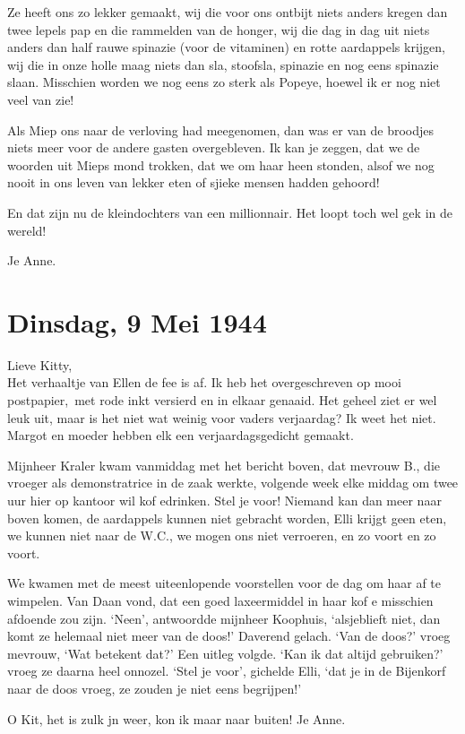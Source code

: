 \documentclass{book}
\begin{document}
Ze heeft ons zo lekker gemaakt, wij die voor ons ontbijt niets anders
kregen dan twee lepels pap en die rammelden van de honger, wij die dag
in dag uit niets anders dan half rauwe spinazie (voor de vitaminen) en
rotte aardappels krijgen, wij die in onze holle maag niets dan sla,
stoofsla, spinazie en nog eens spinazie slaan. Misschien worden we nog
eens zo sterk als Popeye, hoewel ik er nog niet veel van zie!

Als Miep ons naar de verloving had meegenomen, dan was er van de
broodjes niets meer voor de andere gasten overgebleven. Ik kan je
zeggen, dat we de woorden uit Mieps mond trokken, dat we om haar heen
stonden, alsof we nog nooit in ons leven van lekker eten of sjieke
mensen hadden gehoord!

En dat zijn nu de kleindochters van een millionnair. Het loopt toch wel
gek in de wereld!

Je Anne.

\chapter{Dinsdag, 9 Mei 1944}

Lieve Kitty,\\Het verhaaltje van Ellen de fee is af. Ik heb het
overgeschreven op mooi postpapier,~met rode inkt versierd en in elkaar
genaaid. Het geheel ziet er wel leuk uit, maar is het niet wat weinig
voor vaders verjaardag? Ik weet het niet. Margot en moeder hebben elk
een verjaardagsgedicht gemaakt.

Mijnheer Kraler kwam vanmiddag met het bericht boven, dat mevrouw B.,
die vroeger als demonstratrice in de zaak werkte, volgende week elke
middag om twee uur hier op kantoor wil kof edrinken. Stel je voor!
Niemand kan dan meer naar boven komen, de aardappels kunnen niet
gebracht worden, Elli krijgt geen eten, we kunnen niet naar de W.C., we
mogen ons niet verroeren, en zo voort en zo voort.

We kwamen met de meest uiteenlopende voorstellen voor de dag om haar af
te wimpelen. Van Daan vond, dat een goed laxeermiddel in haar kof e
misschien afdoende zou zijn. `Neen', antwoordde mijnheer Koophuis,
`alsjeblieft niet, dan komt ze helemaal niet meer van de doos!' Daverend
gelach. `Van de doos?' vroeg mevrouw, `Wat betekent dat?' Een uitleg
volgde. `Kan ik dat altijd gebruiken?' vroeg ze daarna heel onnozel.
`Stel je voor', gichelde Elli, `dat je in de Bijenkorf naar de doos
vroeg, ze zouden je niet eens begrijpen!'

O Kit, het is zulk jn weer, kon ik maar naar buiten! Je Anne.
\end{document}
